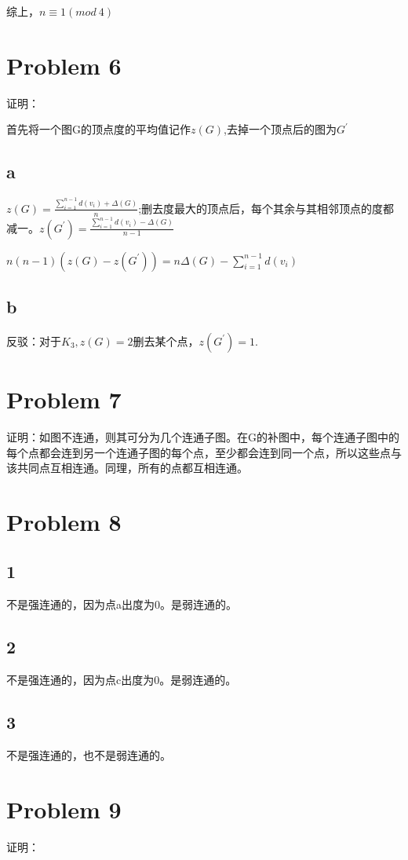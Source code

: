 \documentclass{article}
\begin{document}
综上，$n\equiv 1(mod~ 4)$

\section*{Problem 6}
证明：

首先将一个图G的顶点度的平均值记作$z(G)$,去掉一个顶点后的图为$G^{'}$
\subsection*{a}
$z(G) = \frac{\sum\limits_{i=1}^{n-1}d(v_i)+\varDelta (G)}{n}$;删去度最大的顶点后，每个其余与其相邻顶点的度都减一。$z(G^{'})=\frac{\sum\limits_{i=1}^{n-1}d(v_i)-\varDelta (G)}{n-1}$

$n(n-1)(z(G)-z(G^{'}))=n\varDelta (G)-\sum\limits_{i=1}^{n-1}d(v_i)$

\subsection*{b}
反驳：对于$K_3,z(G)=2$删去某个点，$z(G^{'})=1.$
\section*{Problem 7}
证明：如图不连通，则其可分为几个连通子图。在G的补图中，每个连通子图中的每个点都会连到另一个连通子图的每个点，至少都会连到同一个点，所以这些点与该共同点互相连通。同理，所有的点都互相连通。

\section*{Problem 8}
\subsection*{1}
不是强连通的，因为点a出度为0。是弱连通的。

\subsection*{2}
不是强连通的，因为点c出度为0。是弱连通的。

\subsection*{3}
不是强连通的，也不是弱连通的。

\section*{Problem 9}
证明：
\end{document}
